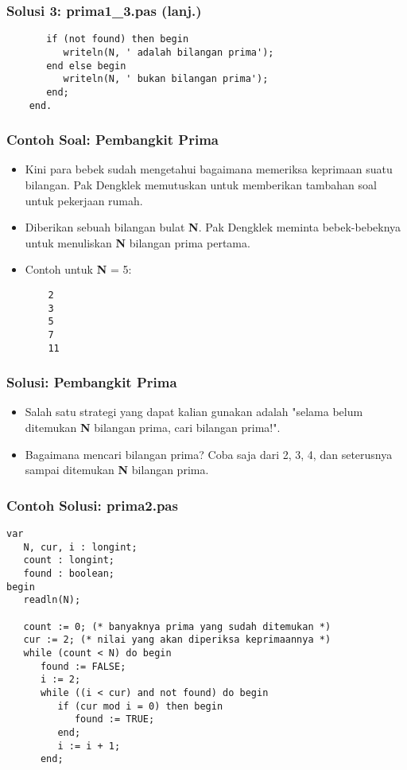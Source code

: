\documentclass{beamer}
\begin{document}
\begin{frame}[fragile]
\frametitle{Solusi 3: prima1\_3.pas (lanj.)}
\begin{lstlisting}
	   if (not found) then begin
	      writeln(N, ' adalah bilangan prima');
	   end else begin
	      writeln(N, ' bukan bilangan prima');
	   end;
	end.
\end{lstlisting}
\end{frame}

\begin{frame}[fragile]
\frametitle{Contoh Soal: Pembangkit Prima}
\begin{itemize}
	\item Kini para bebek sudah mengetahui bagaimana memeriksa keprimaan suatu bilangan. Pak Dengklek memutuskan untuk memberikan tambahan soal untuk pekerjaan rumah.
	\item Diberikan sebuah bilangan bulat \textbf{N}. Pak Dengklek meminta bebek-bebeknya untuk menuliskan \textbf{N} bilangan prima pertama.
	\item Contoh untuk \textbf{N} = 5:
	\begin{lstlisting}
	2
	3
	5
	7
	11
	\end{lstlisting}
\end{itemize}
\end{frame}

\begin{frame}
\frametitle{Solusi: Pembangkit Prima}
\begin{itemize}
	\item Salah satu strategi yang dapat kalian gunakan adalah "selama belum ditemukan \textbf{N} bilangan prima, cari bilangan prima!".
	\item Bagaimana mencari bilangan prima? Coba saja dari 2, 3, 4, dan seterusnya sampai ditemukan \textbf{N} bilangan prima.
\end{itemize}
\end{frame}

\begin{frame}[fragile]
\frametitle{Contoh Solusi: prima2.pas}
\begin{lstlisting}
var
   N, cur, i : longint;
   count : longint;
   found : boolean;
begin
   readln(N);

   count := 0; (* banyaknya prima yang sudah ditemukan *)
   cur := 2; (* nilai yang akan diperiksa keprimaannya *)
   while (count < N) do begin
      found := FALSE;
      i := 2;
      while ((i < cur) and not found) do begin
         if (cur mod i = 0) then begin
            found := TRUE;
         end;
         i := i + 1;
      end;
\end{lstlisting}
\end{frame}
\end{document}
